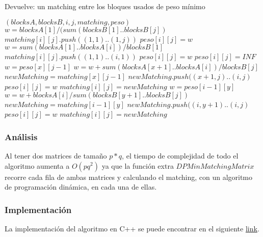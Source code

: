 Devuelve: un matching entre los bloques usados de peso mínimo
\begin{algorithmic}[1]
  $(blocksA,blocksB,i,j,matching,peso)$
    \STATE $w=blocksA[1]/(sum(blocksB[1]..blocksB[j])$
    \STATE $matching[i][j].push((1,1)..(1,j))$
    \STATE $peso[i][j] = w$
  \ENDIF
    \STATE $w=sum(blocksA[1]..blocksA[i])/blocksB[1]$
    \STATE $matching[i][j].push((1,1)..(i,1))$
    \STATE $peso[i][j] = w$
  \ELSE
    \STATE $peso[i][j] = INF$
        \STATE $w=peso[x][j-1]$
        \STATE $w=w+sum(blocksA[x+1]..blocksA[i])/blocksB[j]$
        \STATE $newMatching=matching[x][j-1]$
        \STATE $newMatching.push((x+1,j)..(i,j)$
            \STATE $peso[i][j] = w$
            \STATE $matching[i][j] = newMatching$
        \ENDIF
    \ENDFOR
        \STATE $w=peso[i-1][y]$
        \STATE $w=w+blocksA[i]/sum(blocksB[y+1]..blocksB[j])$
        \STATE $newMatching=matching[i-1][y]$
        \STATE $newMatching.push((i,y+1)..(i,j)$
            \STATE $peso[i][j] = w$
            \STATE $matching[i][j] = newMatching$
        \ENDIF
    \ENDFOR
    \ENDIF
\end{algorithmic}
\subsubsection*{Análisis}
Al tener dos matrices de tamaño $p*q$, el tiempo de complejidad de todo el algoritmo aumenta a $O(pq^2)$ ya que la función extra $DPMinMatchingMatrix$ recorre cada fila de ambas matrices y calculando el matching, con un algoritmo de programación dinámica, en cada una de ellas.

\subsubsection*{Implementación}
La implementación del algoritmo en C++ se puede encontrar en el siguiente \href{https://github.com/Guillermo598/ProyectoADA/blob/master/Pregunta7.cpp}{link}.